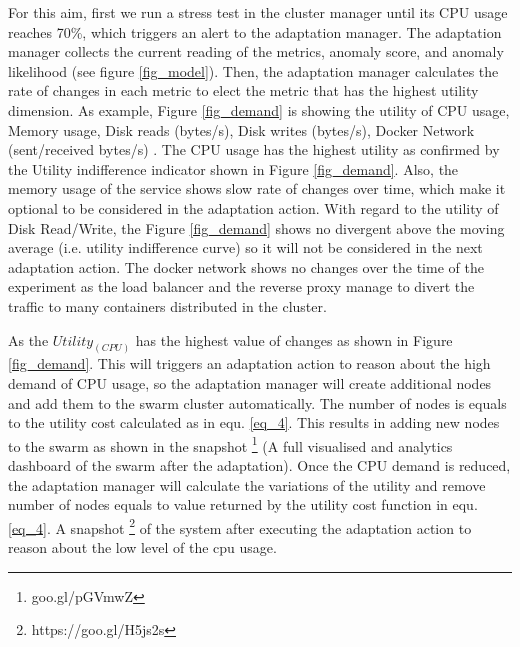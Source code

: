 \documentclass[graybox]{svmult}
\begin{document}
For this aim, first we run a stress test in the cluster manager until its CPU usage reaches 70\%, which triggers an alert to the adaptation manager. The adaptation manager collects the current reading of the metrics, anomaly score, and anomaly likelihood (see figure \ref{fig_model}). Then, the adaptation manager calculates the rate of changes in each metric to elect the metric that has the highest utility dimension. As example, Figure \ref{fig_demand} is showing the utility of CPU usage, Memory usage, Disk reads (bytes/s), Disk writes (bytes/s), Docker Network (sent/received bytes/s) . The CPU usage has the highest utility as confirmed by the Utility indifference indicator shown in Figure \ref{fig_demand}. Also, the memory usage of the service shows slow rate of changes over time, which make it optional to be considered in the adaptation action. With regard to the utility of Disk Read/Write, the Figure \ref{fig_demand} shows no divergent above the moving average (i.e. utility indifference curve) so it will not be considered in the next adaptation action. The docker network shows no changes over the time of the experiment as the load balancer and the reverse proxy manage to divert the traffic to many containers distributed in the cluster.

As the $Utility_(CPU)$ has the highest value of changes as shown in Figure \ref{fig_demand}. This will triggers an adaptation action to reason about the high demand of CPU usage, so the adaptation manager will create additional nodes and add them to the swarm cluster automatically. The number of nodes is equals to the utility cost calculated as in equ. \ref{eq_4}. This results in adding new nodes to the swarm as shown in the snapshot \footnote{goo.gl/pGVmwZ} (A full visualised and analytics dashboard of the swarm after the adaptation).
Once the CPU demand is reduced, the adaptation manager will calculate the variations of the utility and remove number of nodes equals to value returned by the utility cost function in equ. \ref{eq_4}. A snapshot \footnote{https://goo.gl/H5js2s} of the system after executing the adaptation action to reason about the low level of the cpu usage. 
\end{document}
